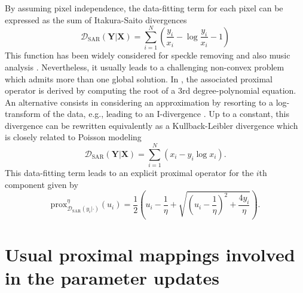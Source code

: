 \documentclass[review]{elsarticle}
\begin{document}
\begin{appendix}
By assuming pixel independence, the data-fitting term for each pixel can be expressed as the sum of Itakura-Saito divergences
\begin{equation}
\mathcal{D}_{\mathrm{SAR}}(\mathbf{Y}|\mathbf{X}) =
 \sum_{i=1}^N \left(\frac{y_i}{x_i} - \log \frac{y_i}{x_i} - 1\right)
\end{equation}
This function has been widely considered for speckle removing \citep{aubert_variational_2008,woo_proximal_2013} and also music analysis \citep{fevotte_nonnegative_2009}. Nevertheless, it usually leads to a challenging non-convex problem which admits more than one global solution. In \citet{sun_alternating_2014}, the associated proximal operator is derived by computing the root of a $3$rd degree-polynomial equation. An alternative consists in considering an approximation by resorting to a log-transform of the data, e.g., leading to an I-divergence \citep{woo_proximal_2013,steidl_removing_2010}. Up to a constant, this divergence can be rewritten equivalently as a Kullback-Leibler divergence which is closely related to Poisson modeling \citep{figueiredo_restoration_2010}
\begin{equation}
\mathcal{D}_{\mathrm{SAR}}(\mathbf{Y}|\mathbf{X}) = \sum_{i=1}^N \left(x_i - y_i \log x_i\right).
\end{equation}
This data-fitting term leads to an explicit proximal operator for the $i$th component given by
\begin{equation}
\mathrm{prox}^{\eta}_{\mathcal{D}_{\mathrm{SAR}}(y_i|\cdot)}\left(u_i\right) = \frac{1}{2}\left(u_i - \frac{1}{\eta} + \sqrt{\left(u_i - \frac{1}{\eta}\right)^2 + \frac{4y_i}{\eta}}\right).
\end{equation}

\section{Usual proximal mappings involved in the parameter updates}
\label{ap:proj}


\end{appendix}
\end{document}
